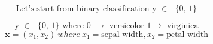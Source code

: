 \documentclass{beamer}
\begin{document}
\begin{frame}
\frametitle{}
\[\text{Let's start from binary classification y $\in $ $\{$0, 1$\}$}\]

\[\text{y $\in $ $\{$0, 1$\}$   where 0 $\to $ versicolor 1$\to $ virginica}\]
\[	
	\mathbf{x} = (x_ 1, x_ 2) \
		where \ x_1 = \text{sepal width}, x_2 = \text{petal width}\]
		
\begin{figure}[htbp] \centering 
{}
\hspace{20pt} 
\end{figure}
\end{frame}
\end{document}
